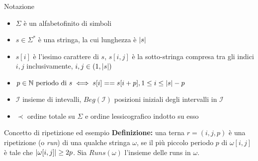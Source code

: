 \documentclass{beamer}
\begin{document}
    \begin{frame}{Notazione}
        \begin{itemize}
            \item \(\Sigma\) è un alfabeto\footnotemark[2] finito di simboli
            \item \(s \in \Sigma^{*}\) è una stringa, la cui lunghezza è \(\left\lvert s \right\rvert\)
            \item \(s[i]\) è l'iesimo carattere di \(s\), 
                \(s[i,j]\) è la sotto-stringa compresa tra gli indici \(i, j\)
                inclusivamente, \(i, j \in \left\lparen 1, \left\lvert s \right\rvert \right\rparen\)
            \item \(p \in \mathbb{N} \text{ periodo di } s 
                \iff s[i] == s[i + p],  1 \le i \le \left\lvert s \right\rvert - p\) 
            \item \(\mathcal{I}\) insieme di intevalli, 
                \(Beg(\mathcal{I})\) posizioni iniziali degli intervalli in \(\mathcal{I}\)
            \item \(\prec\) ordine totale su \(\Sigma\) e ordine lessicografico
                indotto su esso
        \end{itemize}

    \end{frame}

    \begin{frame}{Concetto di ripetizione ed esempio}
        \textbf{Definizione: } una terna \(r = (i, j, p)\) è una ripetizione 
        (o \emph{run}) di una qualche stringa \(\omega\),
        se il più piccolo periodo \(p\) di \(\omega[i, j]\) è tale che 
        \(\left\lvert \omega[i, j] \right\rvert \ge 2p\).
        \vskip 15pt 
        Sia \(Runs(\omega)\) l'insieme delle runs in \(\omega\). 
    \end{frame}
\end{document}
